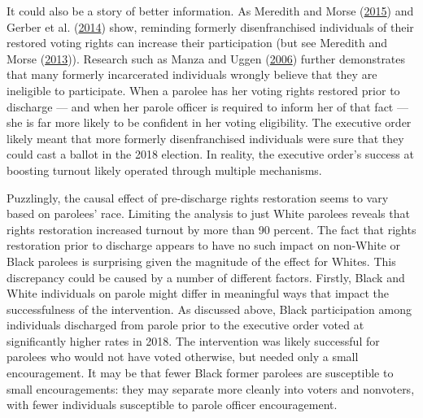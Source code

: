 \documentclass[
  12pt,
]{article}
\begin{document}
It could also be a story of better information. As Meredith and Morse (\protect\hyperlink{ref-Meredith2015}{2015}) and Gerber et al. (\protect\hyperlink{ref-Gerber2014}{2014}) show, reminding formerly disenfranchised individuals of their restored voting rights can increase their participation (but see Meredith and Morse (\protect\hyperlink{ref-Meredith2013}{2013})). Research such as Manza and Uggen (\protect\hyperlink{ref-locked_out}{2006}) further demonstrates that many formerly incarcerated individuals wrongly believe that they are ineligible to participate. When a parolee has her voting rights restored prior to discharge --- and when her parole officer is required to inform her of that fact --- she is far more likely to be confident in her voting eligibility. The executive order likely meant that more formerly disenfranchised individuals were sure that they could cast a ballot in the 2018 election. In reality, the executive order's success at boosting turnout likely operated through multiple mechanisms.

Puzzlingly, the causal effect of pre-discharge rights restoration seems to vary based on parolees' race. Limiting the analysis to just White parolees reveals that rights restoration increased turnout by more than 90 percent. The fact that rights restoration prior to discharge appears to have no such impact on non-White or Black parolees is surprising given the magnitude of the effect for Whites. This discrepancy could be caused by a number of different factors. Firstly, Black and White individuals on parole might differ in meaningful ways that impact the successfulness of the intervention. As discussed above, Black participation among individuals discharged from parole prior to the executive order voted at significantly higher rates in 2018. The intervention was likely successful for parolees who would not have voted otherwise, but needed only a small encouragement. It may be that fewer Black former parolees are susceptible to small encouragements: they may separate more cleanly into voters and nonvoters, with fewer individuals susceptible to parole officer encouragement.
\end{document}

